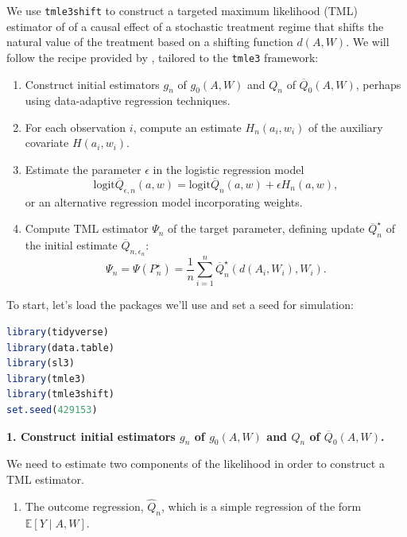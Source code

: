 \documentclass[
  12pt, krantz2,
]{book}
\newcommand{\passthrough}[1]{#1}
\providecommand{\tightlist}{%
  \setlength{\itemsep}{0pt}\setlength{\parskip}{0pt}}
\theoremstyle{definition}
\theoremstyle{definition}
\theoremstyle{definition}
\newcommand{\1}{\mathbbm{1}}
\begin{document}
We use \passthrough{\lstinline!tmle3shift!} to construct a targeted maximum likelihood (TML) estimator of
of a causal effect of a stochastic treatment regime that shifts the natural
value of the treatment based on a shifting function \(d(A,W)\). We will follow
the recipe provided by \citet{diaz2018stochastic}, tailored to the \passthrough{\lstinline!tmle3!} framework:

\begin{enumerate}
\def\labelenumi{\arabic{enumi}.}
\tightlist
\item
  Construct initial estimators \(g_n\) of \(g_0(A, W)\) and \(Q_n\) of
  \(\overline{Q}_0(A, W)\), perhaps using data-adaptive regression techniques.
\item
  For each observation \(i\), compute an estimate \(H_n(a_i, w_i)\) of the
  auxiliary covariate \(H(a_i,w_i)\).
\item
  Estimate the parameter \(\epsilon\) in the logistic regression model
  \[ \text{logit}\overline{Q}_{\epsilon, n}(a, w) =
  \text{logit}\overline{Q}_n(a, w) + \epsilon H_n(a, w),\]
  or an alternative regression model incorporating weights.
\item
  Compute TML estimator \(\Psi_n\) of the target parameter, defining update
  \(\overline{Q}_n^{\star}\) of the initial estimate
  \(\overline{Q}_{n, \epsilon_n}\):
  \begin{equation*}\label{eqn:tmle}
    \Psi_n = \Psi(P_n^{\star}) = \frac{1}{n} \sum_{i = 1}^n
    \overline{Q}_n^{\star}(d(A_i, W_i), W_i).
  \end{equation*}
\end{enumerate}

To start, let's load the packages we'll use and set a seed for simulation:

\begin{lstlisting}[language=R]
library(tidyverse)
library(data.table)
library(sl3)
library(tmle3)
library(tmle3shift)
set.seed(429153)
\end{lstlisting}

\textbf{1. Construct initial estimators \(g_n\) of \(g_0(A, W)\) and \(Q_n\) of
\(\overline{Q}_0(A, W)\).}

We need to estimate two components of the likelihood in order to construct a
TML estimator.

\begin{enumerate}
\def\labelenumi{\arabic{enumi}.}
\tightlist
\item
  The outcome regression, \(\hat{Q}_n\), which is a simple regression of the
  form \(\mathbb{E}[Y \mid A,W]\).
\end{enumerate}
\end{document}
